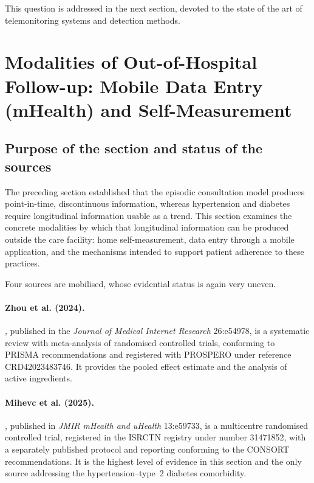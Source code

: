 \documentclass[12pt,a4paper,oneside]{report}
\begin{document}
This question is addressed in the next section, devoted to the state of the art of telemonitoring systems and detection methods.

\section{Modalities of Out-of-Hospital Follow-up: Mobile Data Entry (mHealth) and Self-Measurement}\label{sec:outpatient}

\subsection*{Purpose of the section and status of the sources}

The preceding section established that the episodic consultation model produces point-in-time, discontinuous information, whereas hypertension and diabetes require longitudinal information usable as a trend. This section examines the concrete modalities by which that longitudinal information can be produced outside the care facility: home self-measurement, data entry through a mobile application, and the mechanisms intended to support patient adherence to these practices.

Four sources are mobilised, whose evidential status is again very uneven.

\paragraph{Zhou et al. (2024).} \textcite{zhou2024}, published in the \emph{Journal of Medical Internet Research} 26:e54978, is a systematic review with meta-analysis of randomised controlled trials, conforming to PRISMA recommendations and registered with PROSPERO under reference CRD42023483746. It provides the pooled effect estimate and the analysis of active ingredients.

\paragraph{Mihevc et al. (2025).} \textcite{mihevc2025}, published in \emph{JMIR mHealth and uHealth} 13:e59733, is a multicentre randomised controlled trial, registered in the ISRCTN registry under number 31471852, with a separately published protocol and reporting conforming to the CONSORT recommendations. It is the highest level of evidence in this section and the only source addressing the hypertension--type~2 diabetes comorbidity.
\end{document}
